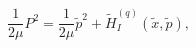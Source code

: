 \begin{equation}
\label{Eq:Ek-q}
\frac{1}{2\mu}P^{2}=\frac{1}{2\mu}\tilde p^{2}+
\tilde H^{(q)}_I(\tilde x,\tilde p),
\end{equation}

